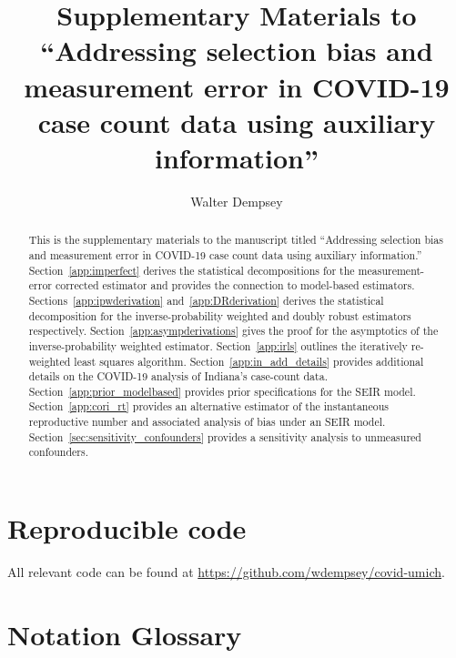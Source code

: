 \documentclass[11pt]{amsart}
\numberwithin{equation}{section}
\theoremstyle{plain}
\begin{document}
\title[Addressing selection bias and measurement error in COVID-19 case counts]{Supplementary Materials to ``Addressing selection bias and measurement error in COVID-19 case count data using auxiliary information''} %

\author{Walter Dempsey}
\address{Department of Biostatistics, University of Michigan, Ann Arbor, MI 48109}

\begin{abstract}
This is the supplementary materials to the manuscript titled ``Addressing selection bias and measurement error in COVID-19 case count data using auxiliary information.''  Section~\ref{app:imperfect} derives the statistical decompositions for the measurement-error corrected estimator and provides the connection to model-based estimators. Sections~\ref{app:ipwderivation} and~\ref{app:DRderivation} derives the statistical decomposition for the inverse-probability weighted and doubly robust estimators respectively.
Section~\ref{app:asympderivations} gives the proof for the asymptotics of the inverse-probability weighted estimator.  
Section~\ref{app:irls} outlines the iteratively re-weighted least squares algorithm.
Section~\ref{app:in_add_details} provides additional details on the COVID-19 analysis of Indiana's case-count data.
Section~\ref{app:prior_modelbased} provides prior specifications for the SEIR model.
Section~\ref{app:cori_rt} provides an alternative estimator of the instantaneous reproductive number and associated analysis of bias under an SEIR model.
Section~\ref{sec:sensitivity_confounders} provides a sensitivity analysis to unmeasured confounders.
\end{abstract}

\maketitle

\newpage
\appendix

\section{Reproducible code}

All relevant code can be found at \url{https://github.com/wdempsey/covid-umich}.

\section{Notation Glossary}
\label{app:notation}
\end{document}
